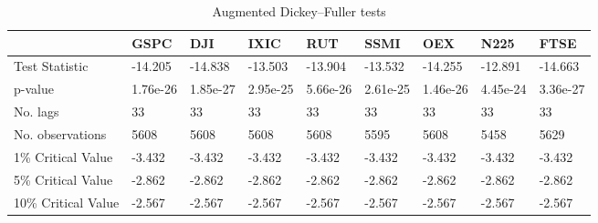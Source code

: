 \documentclass[a4paper, oneside]{discothesis}
\begin{document}
\begin{table}[!ht]\label{tb:ADF_table}
    \scriptsize
    \centering
    \begin{tabular}{|p{1cm}||p{}|p{}|p{}|p{}|p{}|p{}|p{}|p{}|}
    \hline
        ~ & GSPC & DJI & IXIC & RUT & SSMI & OEX & N225 & FTSE \\ \hline\hline
        Test Statistic & -14.205 & -14.838 & -13.503 & -13.904 & -13.532 & -14.255 & -12.891 & -14.663 \\ \hline
        p-value & 1.76e-26&	1.85e-27&	2.95e-25&	5.66e-26&	2.61e-25&	1.46e-26&	4.45e-24&	3.36e-27 \\ \hline
        No. lags & 33 & 33 & 33 & 33 & 33 & 33 & 33 & 33 \\ \hline
        No. observations & 5608 & 5608 & 5608 & 5608 & 5595 & 5608 & 5458 & 5629 \\ \hline
        1\% Critical Value & -3.432 & -3.432 & -3.432 & -3.432 & -3.432 & -3.432 & -3.432 & -3.432 \\ \hline
        5\% Critical Value & -2.862 & -2.862 & -2.862 & -2.862 & -2.862 & -2.862 & -2.862 & -2.862 \\ \hline
        10\% Critical Value & -2.567 & -2.567 & -2.567 & -2.567 & -2.567 & -2.567 & -2.567 & -2.567 \\ \hline
    \end{tabular}
    \normalsize	
    \caption{Augmented Dickey–Fuller tests}
\end{table}
\end{document}
